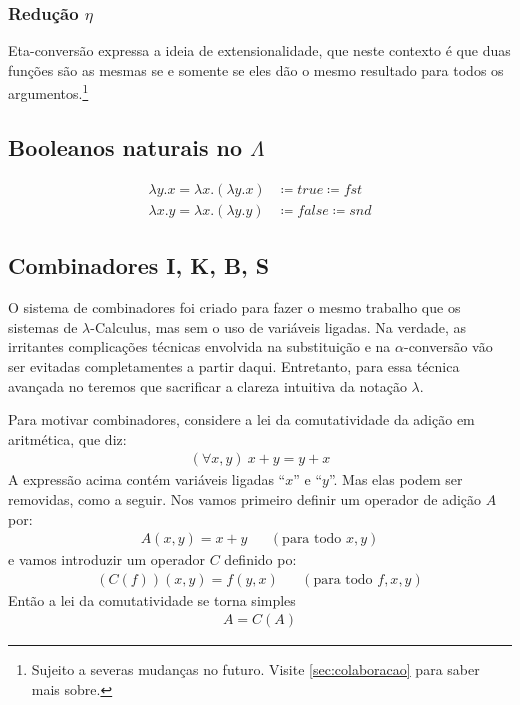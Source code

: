 \documentclass[12pt, a4paper]{article}
\begin{document}
\subsubsection{Redução $\eta$}
Eta-conversão expressa a ideia de extensionalidade, que neste contexto é que duas funções são as mesmas se e somente se eles dão o mesmo resultado para todos os argumentos.\footnote{Sujeito a severas mudanças no futuro. Visite \ref{sec:colaboracao} para saber mais sobre.}

\subsection{Booleanos naturais no $\Lambda$}
\begin{align*}
\lambda y.x = \lambda x.(\lambda y.x) &\coloneqq true \coloneqq fst\\
\lambda x.y = \lambda x.(\lambda y.y) &\coloneqq false \coloneqq snd
\end{align*}
\subsection{Combinadores I, K, B, S \cite{book:111321}}
O sistema de combinadores foi criado para fazer o mesmo trabalho que os sistemas de $\lambda$-Calculus, mas sem o uso de variáveis ligadas. Na verdade, as irritantes complicações técnicas envolvida na substituição e na $\alpha$-conversão vão ser evitadas completamentes a partir daqui. Entretanto, para essa técnica avançada no teremos que sacrificar a clareza intuitiva da notação $\lambda$.

Para motivar combinadores, considere a lei da comutatividade da adição em aritmética, que diz:
\begin{align*}
(\forall x,y)~x+y = y + x
\end{align*}  
A expressão acima contém variáveis ligadas ``$x$'' e ``$y$''. Mas elas podem ser removidas, como a seguir. Nos vamos primeiro definir um operador de adição $A$ por:
\begin{align*}
A(x,y) = x + y && (\text{para todo } x,y)
\end{align*}
e vamos introduzir um operador $C$ definido po:
\begin{align*}
(C(f))(x,y) = f(y,x) && (\text{para todo } f,x,y)
\end{align*}
Então a lei da comutatividade se torna simples
\begin{align*}
A = C(A)
\end{align*}
\end{document}
